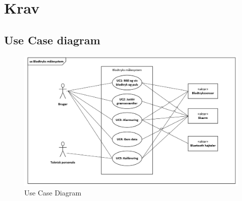 \chapter{Krav}


\section{Use Case diagram}
	\vspace{0.4 cm}
	
\begin{figure}[h!]
	\centering
	\includegraphics[width=0.75\linewidth]{Kravspecifikation/Diagram}
	\caption{Use Case Diagram}
	\label{fig:Use_Case_Diagram}
\end{figure}

\vspace{0.8 cm}



\vspace{0.5 cm}




